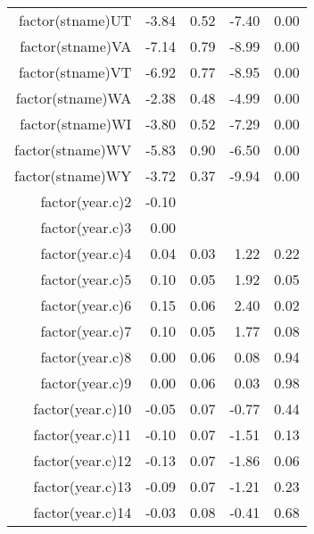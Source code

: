 \begin{table}[ht]
\begin{tabular}{rrrrr}
  factor(stname)UT & -3.84 & 0.52 & -7.40 & 0.00 \\ 
  factor(stname)VA & -7.14 & 0.79 & -8.99 & 0.00 \\ 
  factor(stname)VT & -6.92 & 0.77 & -8.95 & 0.00 \\ 
  factor(stname)WA & -2.38 & 0.48 & -4.99 & 0.00 \\ 
  factor(stname)WI & -3.80 & 0.52 & -7.29 & 0.00 \\ 
  factor(stname)WV & -5.83 & 0.90 & -6.50 & 0.00 \\ 
  factor(stname)WY & -3.72 & 0.37 & -9.94 & 0.00 \\ 
  factor(year.c)2 & -0.10 &  &  &  \\ 
  factor(year.c)3 & 0.00 &  &  &  \\ 
  factor(year.c)4 & 0.04 & 0.03 & 1.22 & 0.22 \\ 
  factor(year.c)5 & 0.10 & 0.05 & 1.92 & 0.05 \\ 
  factor(year.c)6 & 0.15 & 0.06 & 2.40 & 0.02 \\ 
  factor(year.c)7 & 0.10 & 0.05 & 1.77 & 0.08 \\ 
  factor(year.c)8 & 0.00 & 0.06 & 0.08 & 0.94 \\ 
  factor(year.c)9 & 0.00 & 0.06 & 0.03 & 0.98 \\ 
  factor(year.c)10 & -0.05 & 0.07 & -0.77 & 0.44 \\ 
  factor(year.c)11 & -0.10 & 0.07 & -1.51 & 0.13 \\ 
  factor(year.c)12 & -0.13 & 0.07 & -1.86 & 0.06 \\ 
  factor(year.c)13 & -0.09 & 0.07 & -1.21 & 0.23 \\ 
  factor(year.c)14 & -0.03 & 0.08 & -0.41 & 0.68 \\ 
   \hline
\end{tabular}
\end{table}
